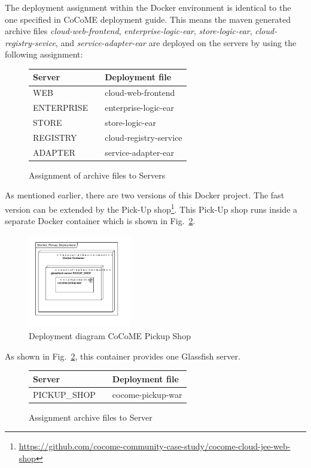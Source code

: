  	\noindent
 	The deployment assignment within the Docker environment is identical to the one specified in CoCoME deployment guide.
 	This means the maven generated archive files \textit{cloud-web-frontend}, \textit{enterprise-logic-ear}, \textit{store-logic-ear}, \textit{cloud-registry-sevice}, and \textit{service-adapter-ear} are deployed on the servers by using the following assignment:
 	\begin{figure}[H]
 		\centering
 		\begin{tabular}{l| l l}%
 			Server && Deployment file \\
 			\hline
 			WEB && cloud-web-frontend  \\
 			ENTERPRISE && enterprise-logic-ear  \\
 			STORE && store-logic-ear  \\
 			REGISTRY && cloud-registry-service  \\
 			ADAPTER && service-adapter-ear \\	
 		\end{tabular}
 		\caption{Assignment of archive files to Servers}
 		\label{table_assignment}
 	\end{figure}
 \noindent
    As mentioned earlier, there are two versions of this Docker project.
 	 The fast version can be extended by the Pick-Up shop\footnote{\url{https://github.com/cocome-community-case-study/cocome-cloud-jee-web-shop}}. This Pick-Up shop runs inside a separate Docker container which is shown in Fig.~\ref{Deploym_Pickup}.  
 	\begin{figure}[h]
 		\centering
 		\includegraphics[width = 0.4\textwidth]{img/docker_Container_PickUP.pdf}
 		\caption{Deployment diagram CoCoME Pickup Shop}
 		\label{Deploym_Pickup}
 	\end{figure}
 	As shown in Fig.~\ref{Deploym_Pickup}, this container provides one Glassfish server.
 	\begin{figure}[H]
 		\centering
 		\begin{tabular}{l|l l}%
 			Server && Deployment file \\
 			\hline
 			PICKUP\_SHOP && cocome-pickup-war \\	
 		\end{tabular}
 		\caption{Assignment archive files to Server}
 		\label{table_assignment_pickup}
 	\end{figure}
